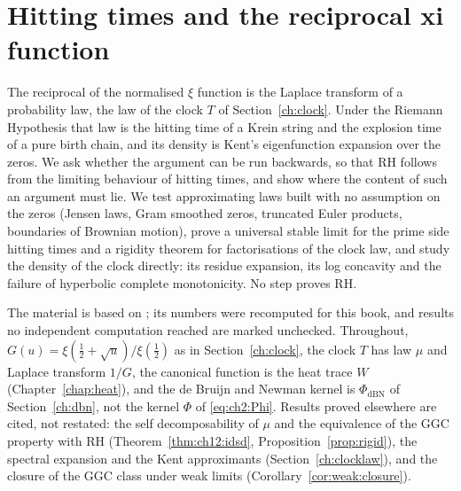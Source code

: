 \chapter{Hitting times and the reciprocal xi function}\label{chap:hitting}\label{ch:ht}

The reciprocal of the normalised $\xi$ function is the Laplace transform of a probability law, the law of the clock $T$ of Section~\ref{ch:clock}. Under the Riemann Hypothesis that law is the hitting time of a Krein string and the explosion time of a pure birth chain, and its density is Kent's eigenfunction expansion over the zeros. We ask whether the argument can be run backwards, so that RH follows from the limiting behaviour of hitting times, and show where the content of such an argument must lie. We test approximating laws built with no assumption on the zeros (Jensen laws, Gram smoothed zeros, truncated Euler products, boundaries of Brownian motion), prove a universal stable limit for the prime side hitting times and a rigidity theorem for factorisations of the clock law, and study the density of the clock directly: its residue expansion, its log concavity and the failure of hyperbolic complete monotonicity. No step proves RH.

The material is based on \cite{P26ht,PolsonResidue26,PolsonEuler26}; its numbers were recomputed for this book, and results no independent computation reached are marked unchecked. Throughout, $G(u)=\xi(\tfrac12+\sqrt u)/\xi(\tfrac12)$ as in Section~\ref{ch:clock}, the clock $T$ has law $\mu$ and Laplace transform $1/G$, the canonical function is the heat trace $W$ (Chapter~\ref{chap:heat}), and the de Bruijn and Newman kernel is $\Phi_{\mathrm{dBN}}$ of Section~\ref{ch:dbn}, not the kernel $\Phi$ of \eqref{eq:ch2:Phi}. Results proved elsewhere are cited, not restated: the self decomposability of $\mu$ and the equivalence of the GGC property with RH (Theorem~\ref{thm:ch12:idsd}, Proposition~\ref{prop:rigid}), the spectral expansion and the Kent approximants (Section~\ref{ch:clocklaw}), and the closure of the GGC class under weak limits (Corollary~\ref{cor:weak:closure}).
